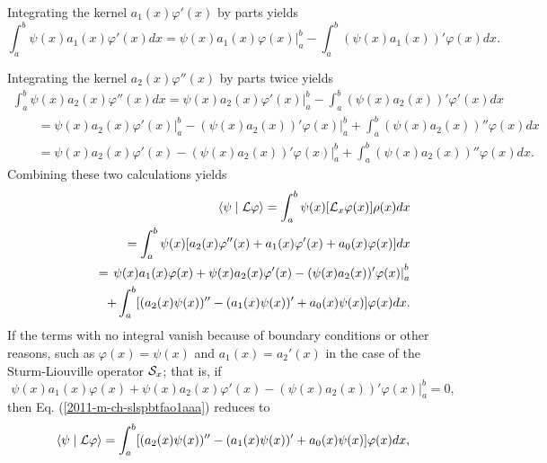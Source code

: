 Integrating the  kernel $a_1(x) \varphi'(x)$ by parts yields
\begin{equation}
\int_a^b
\psi (x)
  a_1(x) \varphi'(x)
dx
=
\left.
\psi (x)
  a_1(x) \varphi(x)
\right|_a^b -  \int_a^b
(\psi (x)
  a_1(x) )'\varphi(x)
dx
.
\end{equation}

Integrating the  kernel $a_2(x) \varphi''(x)$ by parts twice yields
\begin{equation}
\begin{split}
\int_a^b
\psi (x)
  a_2(x) \varphi''(x)
dx
=
\left.
\psi (x)
  a_2(x) \varphi'(x)
\right|_a^b -  \int_a^b
(\psi (x)
  a_2(x) )'\varphi'(x)
dx
\\
\qquad =
\left.
\psi (x)
  a_2(x) \varphi'(x)
\right|_a^b -
\left.
(\psi (x)
  a_2(x))' \varphi(x)
\right|_a^b
+
  \int_a^b
(\psi (x)
  a_2(x) )''\varphi(x)
dx    \\
\qquad =
\left.
\psi (x)
  a_2(x) \varphi'(x)
 -
(\psi (x)
  a_2(x))' \varphi(x)
\right|_a^b
+
  \int_a^b
(\psi (x)
  a_2(x) )''\varphi(x)
dx
.
\end{split}
\end{equation}
Combining these two calculations yields
\begin{equation}
\begin{split}
\langle \psi \mid {\cal L} \varphi \rangle
=
\int_a^b
\psi (x) [{\cal L}_x\varphi (x)]
\rho  (x)         dx   \\
\qquad =
\int_a^b
\psi (x)
[a_2(x) \varphi''(x) + a_1(x) \varphi'(x) + a_0(x) \varphi (x)]
dx      \\
\qquad =
\left.
\psi (x)
  a_1(x) \varphi(x)
+
\psi (x)
  a_2(x) \varphi'(x)
 -
(\psi (x)
  a_2(x))' \varphi(x)
\right|_a^b   \\
\qquad
\qquad
+
  \int_a^b
[( a_2(x)\psi (x) )'' - ( a_1(x)\psi (x)  )'    + a_0(x) \psi (x)] \varphi(x)
dx
.
\end{split}
\label{2011-m-ch-slspbtfao1aaa}
\end{equation}
If the terms with no integral vanish because of boundary conditions or other reasons,
such as $\varphi (x)= \psi (x)$ and $a_1(x)=a_2'(x)$ in the case of the Sturm-Liouville
operator ${\cal S}_x$; that is, if
\begin{equation}
\left.
\psi (x)
  a_1(x) \varphi(x)
+
\psi (x)
  a_2(x) \varphi'(x)
 -
(\psi (x)
  a_2(x))' \varphi(x)
\right|_a^b
=0,
\label{2016-m-ch-sl-bc}
\end{equation}
then Eq. (\ref{2011-m-ch-slspbtfao1aaa}) reduces to
\begin{equation}
\langle \psi \mid {\cal L} \varphi \rangle
=
  \int_a^b
[( a_2(x)\psi (x) )'' - ( a_1(x)\psi (x)  )'    + a_0(x) \psi (x)] \varphi(x)
dx
,
\label{2011-m-ch-slspbtfao1aaa1}
\end{equation}
